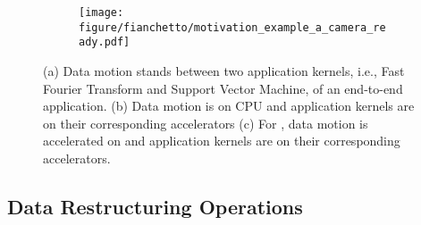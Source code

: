 \begin{figure}[ht!]
    \centering
    \begin{subfigure}[b]{\columnwidth}
    \texttt{[image: figure/fianchetto/motivation\_example\_a\_camera\_ready.pdf]}
    \caption{}
    \label{fig:motivation:example-a}
    \end{subfigure}
    \begin{subfigure}[b]{\columnwidth}
    \end{subfigure}
    \begin{subfigure}[b]{\columnwidth}
    \end{subfigure}
    \caption[Data motion stands between two application kernels, i.e., Fast Fourier Transform and Support Vector Machine, of an end-to-end application.]{ 
    (a) Data motion stands between two application kernels, i.e., Fast Fourier Transform and Support Vector Machine, of an end-to-end application.  
    (b) Data motion is on CPU and application kernels are on their corresponding accelerators 
    (c) For \dmx, data motion is accelerated on \drx and application kernels are on their corresponding accelerators.
    }
    \label{fig:motiv-ex}
    \vspace{-3ex}
\end{figure}

\subsection{Data Restructuring Operations}
\label{sec:motivation:operations}


